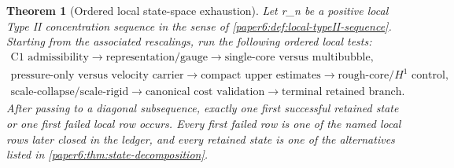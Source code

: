 \documentclass[11pt]{amsart}
\def\({}%
\def\){}%
\theoremstyle{plain}
\newtheorem{theorem}{Theorem}[section]
\theoremstyle{definition}
\theoremstyle{remark}
\begin{document}
\begin{theorem}[Ordered local state-space exhaustion]
\label{paper6:thm:ordered-local-state-space-exhaustion}
\label{paper6:thm:ordered-state-space-exhaustion}
Let \(r_n\) be a positive local Type II concentration sequence in the
sense of \cref{paper6:def:local-typeII-sequence}.  Starting from the associated
rescalings, run the following ordered local tests:
\[
\begin{array}{l}
\text{C1 admissibility}
\to
\text{representation/gauge}
\to
\text{single-core versus multibubble},
\\[2pt]
\text{pressure-only versus velocity carrier}
\to
\text{compact upper estimates}
\to
\text{rough-core/}H^1\text{ control},
\\[2pt]
\text{scale-collapse/scale-rigid}
\to
\text{canonical cost validation}
\to
\text{terminal retained branch}.
\end{array}
\]
After passing to a diagonal subsequence, exactly one first successful retained
state or one first failed local row occurs.  Every first failed row is one of
the named local rows later closed in the ledger, and every retained state is
one of the alternatives listed in \cref{paper6:thm:state-decomposition}.
\end{theorem}
\end{document}
